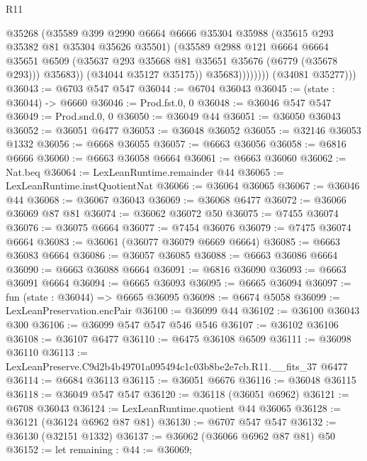 \begin{lexlean}{R11}
\begin{coremodule}
                          @35268
                          (@35589
                            @399
                            @2990
                            @6664
                            @6666
                            @35304
                            @35988
                            (@35615 @293 @35382 @81 @35304 @35626 @35501)
                            (@35589
                              @2988
                              @121
                              @6664
                              @6664
                              @35651
                              @6509
                              (@35637 @293 @35668 @81 @35651 @35676 (@6779 (@35678 @293)))
                              @35683))
                          (@34044 @35127 @35175))
                        @35683))))))))
        (@34081 @35277)))
@36043 := @6703 @547 @547
@36044 := @6704 @36043
@36045 := (state : @36044) -> @6660
@36046 := Prod.fst.{0, 0}
@36048 := @36046 @547 @547
@36049 := Prod.snd.{0, 0}
@36050 := @36049 @44
@36051 := @36050 @36043
@36052 := @36051 @6477
@36053 := @36048 @36052
@36055 := @32146 @36053 @1332
@36056 := @6668 @36055
@36057 := @6663 @36056
@36058 := @6816 @6666
@36060 := @6663 @36058 @6664
@36061 := @6663 @36060
@36062 := Nat.beq
@36064 := LexLeanRuntime.remainder @44
@36065 := LexLeanRuntime.instQuotientNat
@36066 := @36064 @36065
@36067 := @36046 @44
@36068 := @36067 @36043
@36069 := @36068 @6477
@36072 := @36066 @36069 @87 @81
@36074 := @36062 @36072 @50
@36075 := @7455 @36074
@36076 := @36075 @6664
@36077 := @7454 @36076
@36079 := @7475 @36074 @6664
@36083 := @36061 (@36077 @36079 @6669 @6664)
@36085 := @6663 @36083 @6664
@36086 := @36057 @36085
@36088 := @6663 @36086 @6664
@36090 := @6663 @36088 @6664
@36091 := @6816 @36090
@36093 := @6663 @36091 @6664
@36094 := @6665 @36093
@36095 := @6665 @36094
@36097 := fun (state : @36044) => @6665 @36095
@36098 := @6674 @5058
@36099 := LexLeanPreservation.encPair
@36100 := @36099 @44
@36102 := @36100 @36043 @300
@36106 := @36099 @547 @547 @546 @546
@36107 := @36102 @36106
@36108 := @36107 @6477
@36110 := @6475 @36108 @6509
@36111 := @36098 @36110
@36113 := LexLeanPreserve.C9d2b4b49701a095494c1c03b8be2e7cb.R11.__fits_37 @6477
@36114 := @6684 @36113
@36115 := @36051 @6676
@36116 := @36048 @36115
@36118 := @36049 @547 @547
@36120 := @36118 (@36051 @6962)
@36121 := @6708 @36043
@36124 := LexLeanRuntime.quotient @44 @36065
@36128 := @36121 (@36124 @6962 @87 @81)
@36130 := @6707 @547 @547
@36132 := @36130 (@32151 @1332)
@36137 := @36062 (@36066 @6962 @87 @81) @50
@36152 := let remaining : @44 := @36069;

\end{coremodule}
\end{lexlean}

